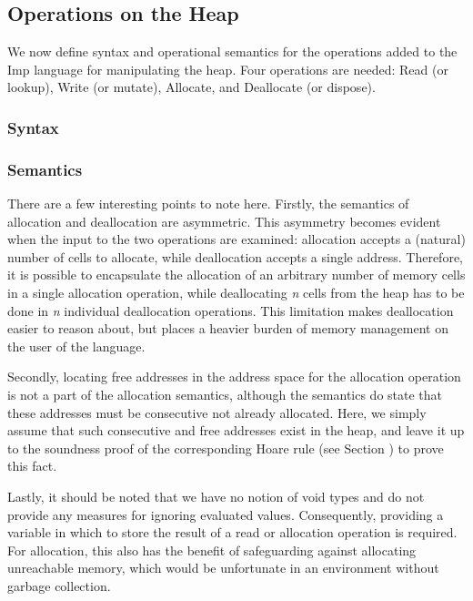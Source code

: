 \subsection{Operations on the Heap}
\label{sec:heap_operations}
We now define syntax and operational semantics for the operations added to the Imp language for manipulating the heap. Four operations are needed: Read (or lookup), Write (or mutate), Allocate, and Deallocate (or dispose).
\subsubsection{Syntax} 
\subsubsection{Semantics}
There are a few interesting points to note here. Firstly, the semantics of allocation and deallocation are asymmetric. This asymmetry becomes evident when the input to the two operations are examined: allocation accepts a (natural) number of cells to allocate, while deallocation accepts a single address. Therefore, it is possible to encapsulate the allocation of an arbitrary number of memory cells in a single allocation operation, while deallocating {\it n} cells from the heap has to be done in {\it n} individual deallocation operations. This limitation makes deallocation easier to reason about, but places a heavier burden of memory management on the user of the language.

Secondly, locating free addresses in the address space for the allocation operation is not a part of the allocation semantics, although the semantics do state that these addresses must be consecutive not already allocated.  Here, we simply assume that such consecutive and free addresses exist in the heap, and leave it up to the soundness proof of the corresponding Hoare rule (see Section ) to prove this fact.

Lastly, it should be noted that we have no notion of void types and do not provide any measures for ignoring evaluated values. Consequently, providing a variable in which to store the result of a read or allocation operation is required. For allocation, this also has the benefit of safeguarding against allocating unreachable memory, which would be unfortunate in an environment without garbage collection.

